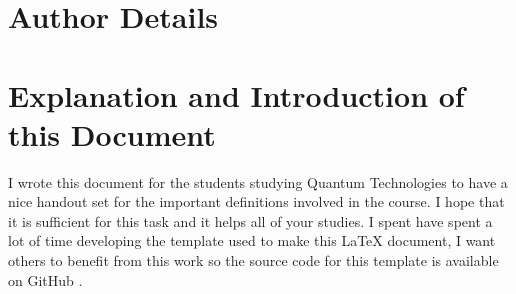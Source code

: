 \documentclass[colorlinks,11pt,a4paper,normalphoto,withhyper,ragged2e]{altareport}
\begin{document}
\MakeReportTitlePage


\setcounter{page}{1}





\section*{Author Details}
\makeauthordetails

\setcounter{tocdepth}{2} 
\tableofcontents %

\fontsize{11pt}{12pt}\selectfont %

\abovedisplayskip=0pt
\abovedisplayshortskip=2pt
\belowdisplayskip=12pt
\belowdisplayshortskip=12pt




\section*{Explanation and Introduction of this Document}
I wrote this document for the students studying Quantum Technologies to have a nice handout set for the important definitions involved in the course. I hope that it is sufficient for this task and it helps all of your studies. \linebreak
I spent have spent a lot of time developing the template used to make this {\LaTeX} document, I want others to benefit from this work so the source code for this template is available on GitHub \cite{latex_template_github}.
\newpage
{} %
	
\end{document}
